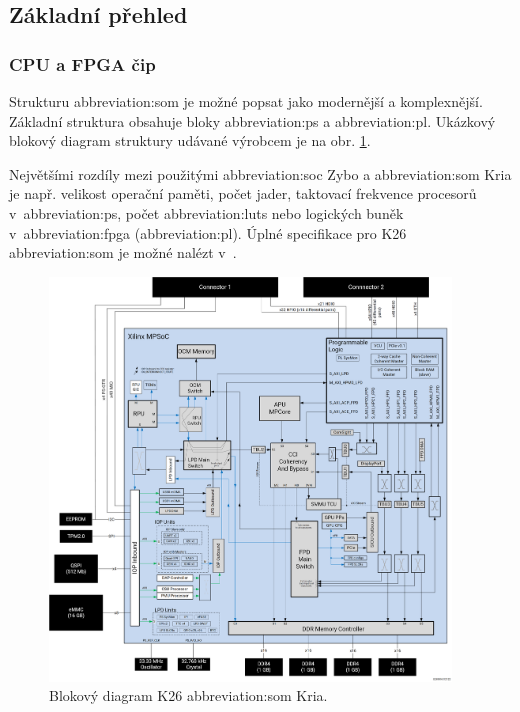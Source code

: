 \documentclass[a4paper, twoside, 11pt]{article}
\newcommand{\fbar}{\FloatBarrier}
\begin{document}
				\subsection{Základní přehled}
					\subsubsection{CPU a FPGA čip}
						Strukturu \gls{abbreviation:som} je možné popsat jako modernější a komplexnější. Základní struktura obsahuje bloky \gls{abbreviation:ps} a \gls{abbreviation:pl}. Ukázkový blokový diagram struktury udávané výrobcem je na obr. \ref{fig:xilinx-kria-k26-block-diagram}.\par
						Největšími rozdíly mezi použitými \gls{abbreviation:soc} Zybo a \gls{abbreviation:som} Kria je např. velikost operační paměti, počet jader, taktovací frekvence procesorů v~\gls{abbreviation:ps}, počet \gls{abbreviation:luts} nebo logických buněk v~\gls{abbreviation:fpga} (\gls{abbreviation:pl}). Úplné specifikace pro K26 \gls{abbreviation:som} je možné nalézt v~\cite{kria-k26-som-ds}.

						\begin{figure}[htbp!]
							\centering
								\includegraphics[width=0.95\textwidth]{src/jpg/xilinx-kria-k26-block-diagram.jpg} 
								\caption{Blokový diagram K26 \gls{abbreviation:som} Kria. \cite{kria-k26-som-ds}}
								\label{fig:xilinx-kria-k26-block-diagram}
						\end{figure}
						\fbar
\end{document}
